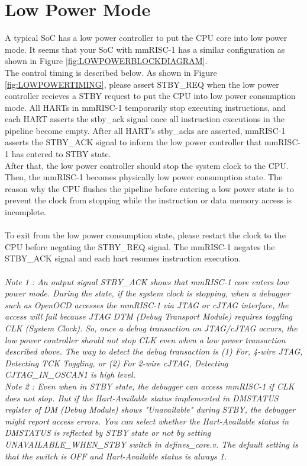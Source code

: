 \section{Low Power Mode}
\label{sec:LOWPOWERMODE}

A typical SoC has a low power controller to put the CPU core into low power mode. It seems that your SoC with mmRISC-1 has a similar configuration as shown in Figure \ref{fig:LOWPOWERBLOCKDIAGRAM}.\\
The control timing is described below. As shown in Figure \ref{fig:LOWPOWERTIMING}, please assert STBY\_REQ when the low power controller recieves a STBY request to put the CPU into low power consumption mode. All HARTs in mmRISC-1 temporarily stop executing instructions, and each HART asserts the stby\_ack signal once all instruction executions in the pipeline become empty. After all HART's stby\_acks are asserted, mmRISC-1 asserts the STBY\_ACK signal to inform the low power controller that mmRISC-1 has entered to STBY state.\\
After that, the low power controller should stop the system clock to the CPU. Then, the mmRISC-1 becomes physically low power consumption state. The reason why the CPU flushes the pipeline before entering a low power state is to prevent the clock from stopping while the instruction or data memory access is incomplete.\\\\

To exit from the low power consumption state, please restart the clock to the CPU before negating the STBY\_REQ signal. The mmRISC-1 negates the STBY\_ACK signal and each hart resumes instruction execution.\\\\

\it{Note 1 : An output signal STBY\_ACK shows that mmRISC-1 core enters low power mode. During the state, if the system clock is stopping, when a debugger such as OpenOCD accesses the mmRISC-1 via JTAG or cJTAG interface, the access will fail because JTAG DTM (Debug Transport Module) requires toggling CLK (System Clock). So, once a debug transaction on JTAG/cJTAG occurs, the low power controller should not stop CLK even when a low power transaction described above. The way to detect the debug transaction is (1) For, 4-wire JTAG, Detecting TCK Toggling, or (2) For 2-wire cJTAG, Detecting CJTAG\_IN\_OSCAN1 is high level.}\rm\\

\it{Note 2 : Even when in STBY state, the debugger can access mmRISC-1 if CLK does not stop. But if the Hart-Available status implemented in DMSTATUS register of DM (Debug Module) shows "Unavailable" during STBY, the debugger might report access errors. You can select whether the Hart-Available status in DMSTATUS is reflected by STBY state or not by setting UNAVAILABLE\_WHEN\_STBY switch in defines\_core.v. The default setting is that the switch is OFF and Hart-Available status is always 1.}\rm{}

